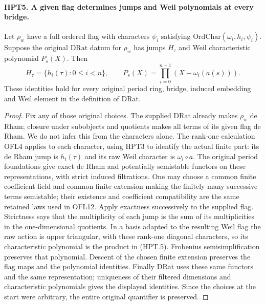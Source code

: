 \paragraph{HPT5. A given flag determines jumps and Weil polynomials at every bridge.}
\label{claim:HPT5}
Let $\rho_w$ have a full ordered flag with characters $\psi_i$
satisfying $\mathrm{OrdChar}(\omega_i,h_i,\psi_i)$.
Suppose the original $\mathrm{DRat}$ datum for $\rho_w$ has jumps
$H_\tau$ and Weil characteristic polynomial $P_s(X)$.
Then
\[
 H_\tau=\{h_i(\tau):0\leq i<n\},\qquad
 P_s(X)=\prod_{i=0}^{n-1}(X-\omega_i(a(s))).                    \tag{HPT.5}
\]
These identities hold for every original period ring, bridge,
induced embedding and Weil element in the definition of
$\mathrm{DRat}$.
\begin{proof}
Fix any of those original choices.  The supplied $\mathrm{DRat}$
already makes $\rho_w$ de Rham; closure under subobjects and
quotients makes all terms of its given flag de Rham.  We do not
infer this from the characters alone.  The rank-one calculation OFL4
applies to each character, using HPT3 to identify the actual finite
part: its de Rham jump is $h_i(\tau)$ and its raw Weil character is
$\omega_i\circ a$.  The original period foundations give exact
de Rham and potentially semistable functors on these representations,
with strict induced filtrations.  One may choose a common finite
coefficient field and common finite extension making the finitely
many successive terms semistable; their existence and coefficient
compatibility are the same retained laws used in OFL12.
Apply exactness successively to the supplied flag.  Strictness says
that the multiplicity of each jump is the sum of its multiplicities
in the one-dimensional quotients.  In a basis adapted to the
resulting Weil flag the raw action is upper triangular, with these
rank-one diagonal characters, so its characteristic polynomial is
the product in (HPT.5).  Frobenius semisimplification preserves that
polynomial.  Descent of the chosen finite extension preserves the
flag maps and the polynomial identities.  Finally $\mathrm{DRat}$
uses these same functors and the same representation; uniqueness
of their filtered dimensions and characteristic polynomials gives
the displayed identities.  Since the choices at the start were
arbitrary, the entire original quantifier is preserved.
\end{proof}

